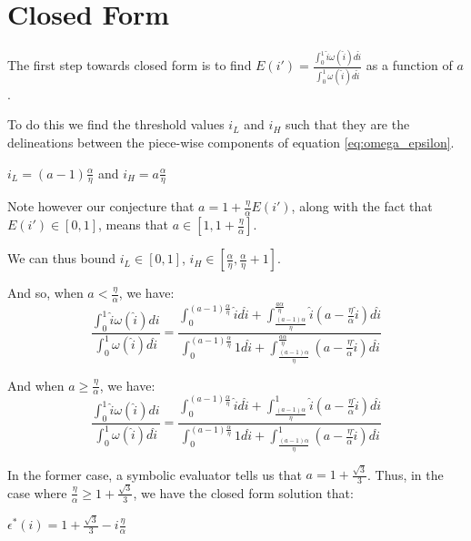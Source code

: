 \documentclass[WP]{AEA}
\begin{document}
\section{Closed Form}

The first step towards closed form is to find  $E(i')=\frac{\int_0^1 \hat{i} \omega(\hat{i})d\hat{i}}{\int_0^1  \omega(\hat{i}) d\hat{i}}$ as a function of $a$. 

To do this we find the threshold values $i_L$ and  $i_H $ such that they are the delineations between the piece-wise components of equation \ref{eq:omega_epsilon}.

$i_L = (a-1)\frac{\alpha}{\eta}$ and 
$i_H = a\frac{\alpha}{\eta}$

Note however our conjecture that $a = 1+\frac{\eta}{\alpha}E(i')$, along with the fact that $E(i') \in [0,1]$, means that $a \in[1,1+\frac{\eta}{\alpha}]$.

We can thus bound $i_L \in [0,1]$, $i_H \in [\frac{\alpha}{\eta}, \frac{\alpha}{\eta} +1]$.

And so, when $a<\frac{\eta}{\alpha}$, we have:
\begin{equation} \label{eq:E_solved_small_a}
\frac{\int_0^1 \hat{i} \omega(\hat{i}) di}{\int_0^1  \omega(\hat{i}) d\hat{i}} 
=  \frac{\int_0^{(a-1)\frac{\alpha}{\eta}}  \hat{i} d\hat{i} + 
	\int_{\frac{(a-1)\alpha}{\eta}}^{\frac{a\alpha}{\eta}}  \hat{i} (a - \frac{\eta}{\alpha}\hat{i}) d\hat{i} }{\int_0^{(a-1)\frac{\alpha}{\eta}} 1 d\hat{i} + 
	\int_{\frac{(a-1)\alpha}{\eta}}^{\frac{a\alpha}{\eta}}  (a - \frac{\eta}{\alpha}\hat{i}) d\hat{i} } 
\end{equation}

And when $a \geq \frac{\eta}{\alpha}$, we have:
\begin{equation}\label{eq:E_solved_big_a}
\frac{\int_0^1 \hat{i} \omega(\hat{i}) di}{\int_0^1  \omega(\hat{i}) d\hat{i}} 
=  \frac{\int_0^{(a-1)\frac{\alpha}{\eta}}  \hat{i} d\hat{i} + 
	\int_{\frac{(a-1)\alpha}{\eta}}^1  \hat{i} (a - \frac{\eta}{\alpha}\hat{i}) d\hat{i} }{\int_0^{(a-1)\frac{\alpha}{\eta}} 1 d\hat{i} + 
	\int_{\frac{(a-1)\alpha}{\eta}}^1  (a - \frac{\eta}{\alpha}\hat{i}) d\hat{i} } 
\end{equation}


In the former case, a symbolic evaluator tells us that $a = 1+\frac{\sqrt{3}}{3}$.  Thus, in the case where $ \frac{\eta}{\alpha} \geq 1+\frac{\sqrt{3}}{3}$, we have the closed form solution that:

$\epsilon^*(i) = 1+\frac{\sqrt{3}}{3} - i \frac{\eta}{\alpha}$
\end{document}
